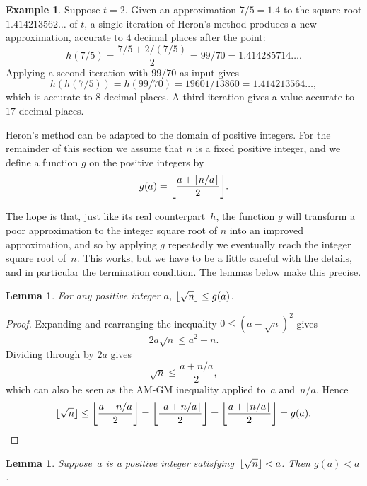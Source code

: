 \documentclass[a4paper]{article}
\DeclarePairedDelimiter\floor{\lfloor}{\rfloor}
\theoremstyle{plain}
\newtheorem{lemma}[theorem]{Lemma}
\theoremstyle{definition}
\newtheorem{example}[theorem]{Example}
\begin{document}
\begin{example}
  Suppose $t=2$. Given an approximation $7/5 = 1.4$ to the square root
  $1.414213562\dots$ of $t$, a single iteration of Heron's method produces a
  new approximation, accurate to $4$ decimal places after the point:
  $$h(7/5) = \frac{7/5 + 2/(7/5)}2 = 99/70 = 1.414285714\dots.$$ Applying a
  second iteration with $99/70$ as input gives
  $$h(h(7/5)) = h(99/70) = 19601/13860 =
  1.414213564\dots,$$ which is accurate to $8$ decimal places. A third
  iteration gives a value accurate to $17$ decimal places.
\end{example}

Heron's method can be adapted to the domain of positive integers. For the
remainder of this section we assume that $n$ is a fixed positive integer, and
we define a function $g$ on the positive integers by
$$g(a) = \floor*{\frac{a + \floor{n/a}}2}.$$

The hope is that, just like its real counterpart~$h$, the function $g$ will
transform a poor approximation to the integer square root of $n$ into an
improved approximation, and so by applying $g$ repeatedly we eventually reach
the integer square root of~$n$. This works, but we have to be a little careful
with the details, and in particular the termination condition. The lemmas below
make this precise.

\begin{lemma}\label{heron_high}
  For any positive integer $a$, $\floor{\sqrt n} \le g(a)$.
\end{lemma}

\begin{proof}
  Expanding and rearranging the inequality $0 \le (a - \sqrt n)^2$ gives
  $$2a\sqrt n \le a^2 + n.$$
  Dividing through by $2a$ gives
  $$\sqrt n \le \frac{a + n/a}2,$$
  which can also be seen as the AM-GM inequality applied to~$a$ and~$n/a$.
  Hence
  $$\floor{\sqrt n} \le \floor*{\frac{a + n/a}2}
  = \floor*{\frac{\floor{a + n/a}}2}
  = \floor*{\frac{a + \floor{n/a}}2} = g(a).$$
\end{proof}

\begin{lemma}\label{heron_decreases}
  Suppose~$a$ is a positive integer satisfying~$\floor{\sqrt n} < a$. Then
  $g(a) < a$.
\end{lemma}
\end{document}
